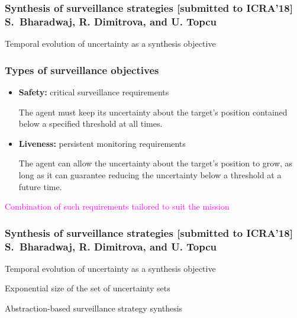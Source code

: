 \documentclass[xcolor=dvipsnames]{beamer}
\begin{document}
\begin{frame}
\frametitle{Synthesis of surveillance strategies  {\small [submitted to ICRA'18]} \newline \small S.\ Bharadwaj, R. Dimitrova, and U. Topcu}

 Temporal evolution of uncertainty as a synthesis objective

\bigskip



\end{frame}

\begin{frame}
\frametitle{Types of surveillance objectives}

\smallskip




\begin{itemize}
\item {\bf Safety:} critical surveillance requirements
\smallskip

The agent must keep its uncertainty about the target's position contained below a specified threshold at all times.

\smallskip


\item {\bf Liveness:} persistent monitoring requirements

\smallskip

The agent can allow the uncertainty about the target's position to grow, as long as it can guarantee reducing the uncertainty below a threshold at a future time.

\end{itemize}

\smallskip 

\textcolor{magenta}{Combination of such requirements tailored to suit the mission} 

\end{frame}

\begin{frame}
\frametitle{Synthesis of surveillance strategies  {\small [submitted to ICRA'18]} \newline \small S.\ Bharadwaj, R. Dimitrova, and U. Topcu}

 Temporal evolution of uncertainty as a synthesis objective

\bigskip



\bigskip
{} Exponential size of the set of uncertainty sets

\bigskip
{} Abstraction-based surveillance strategy synthesis
\end{frame}
\end{document}
